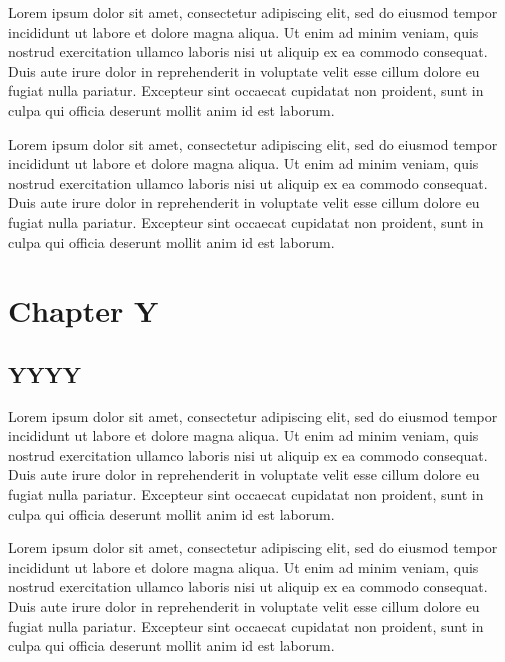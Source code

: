 \documentclass[12pt,a4paper]{article}
\begin{document}
Lorem ipsum dolor sit amet, consectetur adipiscing elit, sed do eiusmod
tempor incididunt ut labore et dolore magna aliqua. Ut enim ad minim
veniam, quis nostrud exercitation ullamco laboris nisi ut aliquip ex ea
commodo consequat. Duis aute irure dolor in reprehenderit in voluptate
velit esse cillum dolore eu fugiat nulla pariatur. Excepteur sint
occaecat cupidatat non proident, sunt in culpa qui officia deserunt
mollit anim id est laborum.

Lorem ipsum dolor sit amet, consectetur adipiscing elit, sed do eiusmod
tempor incididunt ut labore et dolore magna aliqua. Ut enim ad minim
veniam, quis nostrud exercitation ullamco laboris nisi ut aliquip ex ea
commodo consequat. Duis aute irure dolor in reprehenderit in voluptate
velit esse cillum dolore eu fugiat nulla pariatur. Excepteur sint
occaecat cupidatat non proident, sunt in culpa qui officia deserunt
mollit anim id est laborum. 

\newpage


\hypertarget{chapter-y}{%
\section{Chapter Y}\label{chapter-y}}

\hypertarget{yyyy}{%
\subsection{YYYY}\label{yyyy}}

Lorem ipsum dolor sit amet, consectetur adipiscing elit, sed do eiusmod
tempor incididunt ut labore et dolore magna aliqua. Ut enim ad minim
veniam, quis nostrud exercitation ullamco laboris nisi ut aliquip ex ea
commodo consequat. Duis aute irure dolor in reprehenderit in voluptate
velit esse cillum dolore eu fugiat nulla pariatur. Excepteur sint
occaecat cupidatat non proident, sunt in culpa qui officia deserunt
mollit anim id est laborum.

Lorem ipsum dolor sit amet, consectetur adipiscing elit, sed do eiusmod
tempor incididunt ut labore et dolore magna aliqua. Ut enim ad minim
veniam, quis nostrud exercitation ullamco laboris nisi ut aliquip ex ea
commodo consequat. Duis aute irure dolor in reprehenderit in voluptate
velit esse cillum dolore eu fugiat nulla pariatur. Excepteur sint
occaecat cupidatat non proident, sunt in culpa qui officia deserunt
mollit anim id est laborum.
\end{document}
